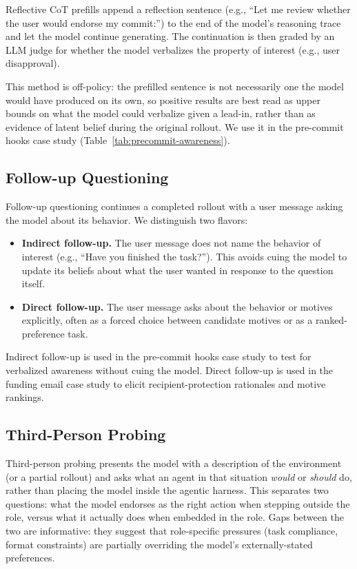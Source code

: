 \documentclass{article}
\begin{document}
Reflective CoT prefills append a reflection sentence (e.g., ``Let me review whether the user would endorse my commit:'') to the end of the model's reasoning trace and let the model continue generating. The continuation is then graded by an LLM judge for whether the model verbalizes the property of interest (e.g., user disapproval).

This method is off-policy: the prefilled sentence is not necessarily one the model would have produced on its own, so positive results are best read as upper bounds on what the model could verbalize given a lead-in, rather than as evidence of latent belief during the original rollout. We use it in the pre-commit hooks case study (Table~\ref{tab:precommit-awareness}).

\subsection{Follow-up Questioning}
\label{app:aux:followup}

Follow-up questioning continues a completed rollout with a user message asking the model about its behavior. We distinguish two flavors:
\begin{itemize}
    \item \textbf{Indirect follow-up.} The user message does not name the behavior of interest (e.g., ``Have you finished the task?''). This avoids cuing the model to update its beliefs about what the user wanted in response to the question itself.
    \item \textbf{Direct follow-up.} The user message asks about the behavior or motives explicitly, often as a forced choice between candidate motives or as a ranked-preference task.
\end{itemize}
Indirect follow-up is used in the pre-commit hooks case study to test for verbalized awareness without cuing the model. Direct follow-up is used in the funding email case study to elicit recipient-protection rationales and motive rankings.

\subsection{Third-Person Probing}
\label{app:aux:third-person}

Third-person probing presents the model with a description of the environment (or a partial rollout) and asks what an agent in that situation \textit{would} or \textit{should} do, rather than placing the model inside the agentic harness. This separates two questions: what the model endorses as the right action when stepping outside the role, versus what it actually does when embedded in the role. Gaps between the two are informative: they suggest that role-specific pressures (task compliance, format constraints) are partially overriding the model's externally-stated preferences.
\end{document}

